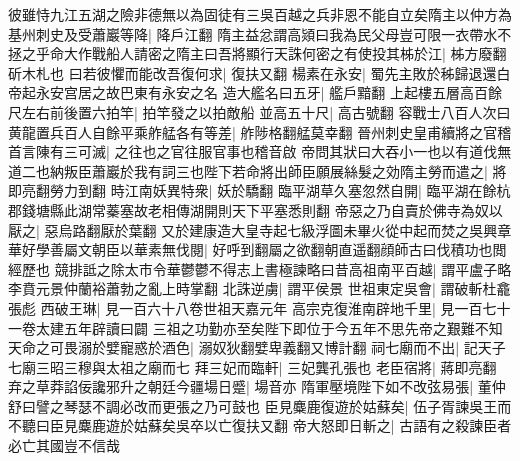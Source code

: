 彼雖恃九江五湖之險非德無以為固徒有三吳百越之兵非恩不能自立矣隋主以仲方為基州刺史及受蕭巖等降|{
	降戶江翻}
隋主益忿謂高熲曰我為民父母豈可限一衣帶水不拯之乎命大作戰船人請密之隋主曰吾將顯行天誅何密之有使投其柹於江|{
	柹方廢翻斫木札也}
曰若彼懼而能改吾復何求|{
	復扶又翻}
楊素在永安|{
	蜀先主敗於秭歸退還白帝起永安宫居之故巴東有永安之名}
造大艦名曰五牙|{
	艦戶黯翻}
上起樓五層高百餘尺左右前後置六拍竿|{
	拍竿發之以拍敵船}
並高五十尺|{
	高古號翻}
容戰士八百人次曰黄龍置兵百人自餘平乘舴艋各有等差|{
	舴陟格翻艋莫幸翻}
晉州刺史皇甫續將之官稽首言陳有三可滅|{
	之往也之官往服官事也稽音啟}
帝問其狀曰大吞小一也以有道伐無道二也納叛臣蕭巖於我有詞三也陛下若命將出師臣願展絲髮之効隋主勞而遣之|{
	將即亮翻勞力到翻}
時江南妖異特衆|{
	妖於驕翻}
臨平湖草久塞忽然自開|{
	臨平湖在餘杭郡錢塘縣此湖常蓁塞故老相傳湖開則天下平塞悉則翻}
帝惡之乃自賣於佛寺為奴以厭之|{
	惡烏路翻厭於葉翻}
又於建康造大皇寺起七級浮圖未畢火從中起而焚之吳興章華好學善屬文朝臣以華素無伐閱|{
	好呼到翻屬之欲翻朝直遥翻顔師古曰伐積功也閲經歷也}
競排詆之除太市令華鬱鬱不得志上書極諫略曰昔高祖南平百越|{
	謂平盧子略李賁元景仲蘭裕蕭勃之亂上時掌翻}
北誅逆虜|{
	謂平侯景}
世祖東定吳會|{
	謂破斬杜龕張彪}
西破王琳|{
	見一百六十八卷世祖天嘉元年}
高宗克復淮南辟地千里|{
	見一百七十一卷太建五年辟讀曰闢}
三祖之功勤亦至矣陛下即位于今五年不思先帝之艱難不知天命之可畏溺於嬖寵惑於酒色|{
	溺奴狄翻嬖卑義翻又博計翻}
祠七廟而不出|{
	記天子七廟三昭三穆與太祖之廟而七}
拜三妃而臨軒|{
	三妃龔孔張也}
老臣宿將|{
	蔣即亮翻}
弃之草莽諂佞讒邪升之朝廷今疆場日蹙|{
	場音亦}
隋軍壓境陛下如不改弦易張|{
	董仲舒曰譬之琴瑟不調必改而更張之乃可鼓也}
臣見麋鹿復遊於姑蘇矣|{
	伍子胥諫吳王而不聽曰臣見麋鹿遊於姑蘇矣吳卒以亡復扶又翻}
帝大怒即日斬之|{
	古語有之殺諫臣者必亡其國豈不信哉}


